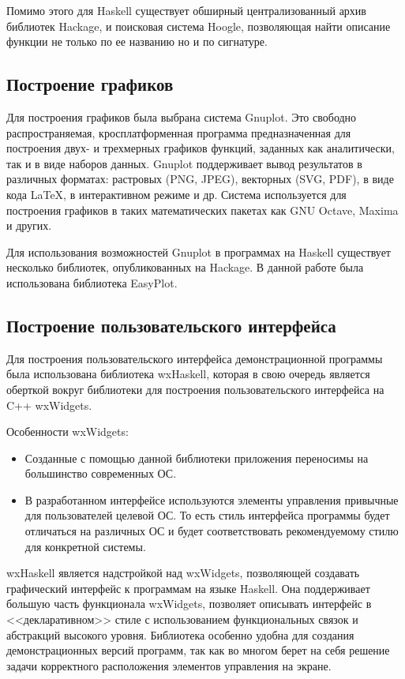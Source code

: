 Помимо этого для Haskell существует обширный централизованный архив библиотек Hackage\cite{hackage}, и поисковая система Hoogle\cite{hoogle}, позволяющая найти описание функции не только по ее названию но и по сигнатуре.

\subsection{Построение графиков}

Для построения графиков была выбрана система Gnuplot\cite{gnuplot}. Это свободно распространяемая, кросплатформенная программа предназначенная для построения двух- и трехмерных графиков функций, заданных как аналитически, так и в виде наборов данных. Gnuplot поддерживает вывод результатов в различных форматах: растровых (PNG, JPEG), векторных (SVG, PDF), в виде кода LaTeX, в интерактивном режиме и др. Система используется для построения графиков в таких математических пакетах как GNU Octave, Maxima и других.

Для использования возможностей Gnuplot в программах на Haskell существует несколько библиотек, опубликованных на Hackage. В данной работе была использована библиотека EasyPlot.


\subsection{Построение пользовательского интерфейса}

Для построения пользовательского интерфейса демонстрационной программы была использована библиотека wxHaskell\cite{wxhaskell}, которая в свою очередь является оберткой вокруг библиотеки для построения пользовательского интерфейса на C++ wxWidgets. 

Особенности wxWidgets:

\begin{itemize}
\item Созданные с помощью данной библиотеки приложения переносимы на большинство современных ОС.

\item В разработанном интерфейсе используются элементы управления привычные для пользователей целевой ОС. То есть стиль интерфейса программы будет отличаться на различных ОС и будет соответствовать рекомендуемому стилю для конкретной системы.

\end{itemize}

wxHaskell является надстройкой над wxWidgets, позволяющей создавать графический интерфейс к программам на языке Haskell. Она поддерживает большую часть функционала wxWidgets, позволяет описывать интерфейс в <<декларативном>> стиле с использованием функциональных связок и абстракций высокого уровня. Библиотека особенно удобна для создания демонстрационных версий программ, так как во многом берет на себя решение задачи корректного расположения элементов управления на экране. 


